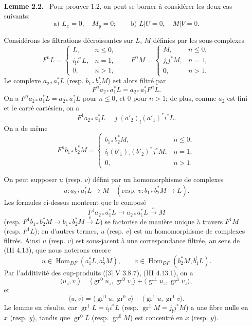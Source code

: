 \documentclass[11pt]{article}
\newenvironment{statement}[1]{\par\medskip\noindent\textbf{#1.}\ }{\par\medskip}
\DeclareMathOperator{\Hom}{Hom}
\providecommand{\Hom}{\operatorname{Hom}}
\providecommand{\Hom}{\operatorname{Hom}}
\begin{document}
\begin{statement}{Lemme 2.2}
Pour prouver 1.2, on peut se borner à considérer les deux cas suivants:
\[
\text{a) } L_x=0,\quad M_y=0;\qquad
\text{b) } L|U=0,\quad M|V=0 .
\]
\end{statement}

Considérons les filtrations décroissantes sur $L$, $M$ définies par les sous-complexes
\[
F^nL=
\begin{cases}
L,& n\le 0,\\
i_!i^*L,& n=1,\\
0,& n>1,
\end{cases}
\qquad
F^nM=
\begin{cases}
M,& n\le 0,\\
j_!j^*M,& n=1,\\
0,& n>1.
\end{cases}
\]
Le complexe $a_{2*}a_1^*L$ (resp. $b_{1*}b_2^*M$) est alors filtré par
\[
F^n a_{2*}a_1^*L=a_{2*}a_1^*F^nL.
\]
On a $F^n a_{2*}a_1^*L=a_{2*}a_1^*L$ pour $n\le 0$, et $0$ pour $n>1$; de plus, comme $a_2$ est fini et le carré cartésien, on a
\[
F^1a_{2*}a_1^*L=j_!(a'_2)_!(a'_1)^*i^*L.
\]
On a de même
\[
F^n b_{1*}b_2^*M=
\begin{cases}
b_{1*}b_2^*M,& n\le 0,\\
i_!(b'_1)_!(b'_2)^*j^*M,& n=1,\\
0,& n>1.
\end{cases}
\]

On peut supposer $u$ (resp. $v$) défini par un homomorphisme de complexes
\[
u:a_{2*}a_1^*L\longrightarrow M
\quad
(\text{resp. }v:b_{1*}b_2^*M\longrightarrow L).
\]
Les formules ci-dessus montrent que le composé
\[
F^1a_{2*}a_1^*L\longrightarrow a_{2*}a_1^*L\xrightarrow{u}M
\]
(resp. $F^1b_{1*}b_2^*M\to b_{1*}b_2^*M\xrightarrow{v}L$) se factorise de manière unique à travers $F^1M$ (resp. $F^1L$); en d'autres termes, $u$ (resp. $v$) est un homomorphisme de complexes filtrés. Ainsi $u$ (resp. $v$) est sous-jacent à une correspondance filtrée, au sens de (III 4.13), que nous noterons encore
\[
u\in\Hom_{DF}(a_1^*L,a_2^!M),\qquad
v\in\Hom_{DF}(b_2^*M,b_1^!L).
\]
Par l'additivité des cup-produits ([3] V 3.8.7), (III 4.13.1), on a
\[
\langle u_z,v_z\rangle
 =\langle \operatorname{gr}^0u_z,\operatorname{gr}^0v_z\rangle
 +\langle \operatorname{gr}^1u_z,\operatorname{gr}^1v_z\rangle,
\]
et
\[
\langle u,v\rangle
 =\langle \operatorname{gr}^0u,\operatorname{gr}^0v\rangle
 +\langle \operatorname{gr}^1u,\operatorname{gr}^1v\rangle.
\]
Le lemme en résulte, car $\operatorname{gr}^1L=i_!i^*L$ (resp. $\operatorname{gr}^1M=j_!j^*M$) a une fibre nulle en $x$ (resp. $y$), tandis que $\operatorname{gr}^0L$ (resp. $\operatorname{gr}^0M$) est concentré en $x$ (resp. $y$).
\end{document}
